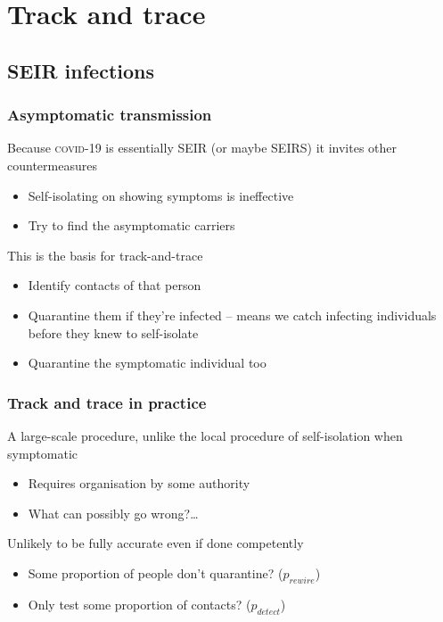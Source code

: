 \documentclass{beamer}
\begin{document}

\section{Track and trace}

\subsection{SEIR infections}

\begin{frame}
  \frametitle{Asymptomatic transmission}

  \begin{block}{Because \textsc{covid-19} is essentially SEIR (or
      maybe SEIRS) it invites other countermeasures}
    \begin{itemize}
    \item Self-isolating on showing symptoms is ineffective
    \item Try to find the asymptomatic carriers
    \end{itemize}
  \end{block}

  \begin{block}{This is the basis for track-and-trace}
    \begin{itemize}
    \item Identify contacts of that person
    \item Quarantine them if they're infected -- means we catch
      infecting individuals before they knew to self-isolate
    \item Quarantine the symptomatic individual too
    \end{itemize}
  \end{block}
\end{frame}

\begin{frame}
  \frametitle{Track and trace in practice}

  \begin{block}{A large-scale procedure, unlike the local procedure of
      self-isolation when symptomatic}
    \begin{itemize}
    \item Requires organisation by some authority
    \item What can possibly go wrong?\ldots
    \end{itemize}
  \end{block}

  \begin{block}{Unlikely to be fully accurate even if done
      competently}
    \begin{itemize}
    \item Some proportion of people don't quarantine? ($p_{rewire}$)
    \item Only test some proportion of contacts? ($p_{detect}$)
    \end{itemize}
  \end{block}
\end{frame}
\end{document}
